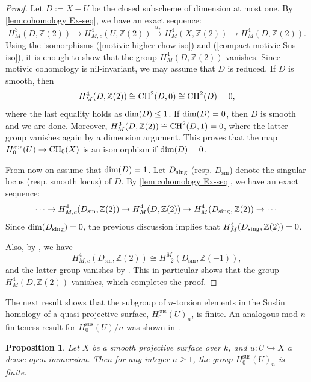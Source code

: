 \documentclass[12pt]{amsart}
\newtheorem{prop}[prop]{Proposition}
\theoremstyle{remark}
\renewcommand{\1}{{\mathbb{S}}}
\newcommand{\CH}{{\rm CH}}
\newcommand{\inj}{\hookrightarrow}
\newcommand{\sing}{{\rm sing}}
\newcommand{\<}{\langle}
\renewcommand{\>}{\rangle}
\newcommand{\sm}{{\operatorname{sm}}}
\newcommand{\Sus}{{\operatorname{sus}}}
\renewcommand{\dim}{\text{\rm dim}}
\begin{document}
\begin{proof}
Let $D := X - U$ be the closed subscheme of dimension at most one. By \autoref{lem:cohomology Ex-seq}, we have an exact sequence:
\[
H_{M}^{3}(D, \mathbb{Z}(2)) \rightarrow H_{M,c}^{4}(U, \mathbb{Z}(2)) \xrightarrow{u_{\ast}} H_{M}^{4}(X, \mathbb{Z}(2)) \rightarrow H_{M}^{4}(D, \mathbb{Z}(2)).
\]
Using the isomorphisms (\ref{motivic-higher-chow-iso}) and (\ref{compact-motivic-Sus-iso}), it is enough to show that the group $H_{M}^{4}(D, \mathbb{Z}(2))$ vanishes. Since motivic cohomology is nil-invariant, we may assume that $D$ is reduced. If $D$ is smooth, then 
\[
H_{M}^{4}(D, \mathbb{Z}(2)) \cong \CH^{2}(D, 0) \cong \CH^2(D) = 0,
\]
where the last equality holds as  $\dim(D) \leq 1$. If $\dim(D) = 0$, then $D$ is smooth and we are done. Moreover, $H_{M}^{3}(D, \mathbb{Z}(2)) \cong \CH^{2}(D, 1) = 0$, where the latter group vanishes again by a dimension argument. This proves that the map
$H^{\mathrm{\Sus}}_{0}(U) \rightarrow \CH_{0}(X)$ is an isomorphism if $\dim(D) = 0$. 

From now on assume that $\dim(D) = 1$. Let $D_{\sing}$ (resp. $D_{\sm}$) denote the singular locus (resp. smooth locus) of $D$. By \autoref{lem:cohomology Ex-seq}, we have an exact sequence:
\[
\cdots \to H^4_{M,c}(D_{\sm}, \mathbb{Z}(2)) \rightarrow H^4_M(D, \mathbb{Z}(2)) \rightarrow H^4_{M}(D_{\sing}, \mathbb{Z}(2)) \to \cdots
\]
Since $\dim(D_{\sing}) = 0$, the previous discussion implies that $H^4_{M}(D_{\sing}, \mathbb{Z}(2)) = 0$.

Also, by \cite[Remark 2.2]{Yam1}, we have 
\[
H^4_{M,c}(D_{\sm}, \mathbb{Z}(2)) \cong H^{M}_{-2}(D_{\sm}, \mathbb{Z}(-1)),
\]
and the latter group vanishes by \cite[Lemma 2.1 (2)]{Yam1}. This in particular shows that the group $H_{M}^{4}(D, \mathbb{Z}(2))$ vanishes, which completes the proof.

\end{proof}


The next result shows that the subgroup of $n$-torsion elements in the Suslin homology of a quasi-projective surface, $H^{\Sus}_{0}(U)_{n}$, is finite. An analogous mod-$n$ finiteness result for $H^{\Sus}_{0}(U)/n$ was shown in \cite[Theorem 1.5]{BK}. 

\begin{prop}\label{finiteness-n-torsion-sus} 
Let $X$ be a smooth projective surface over $k$, and  
$u \colon U \inj X$  a dense open immersion. Then for any integer $n\geq 1$, the group $H^{\Sus}_{0}(U)_{n}$ is finite.
\end{prop}
\end{document}

